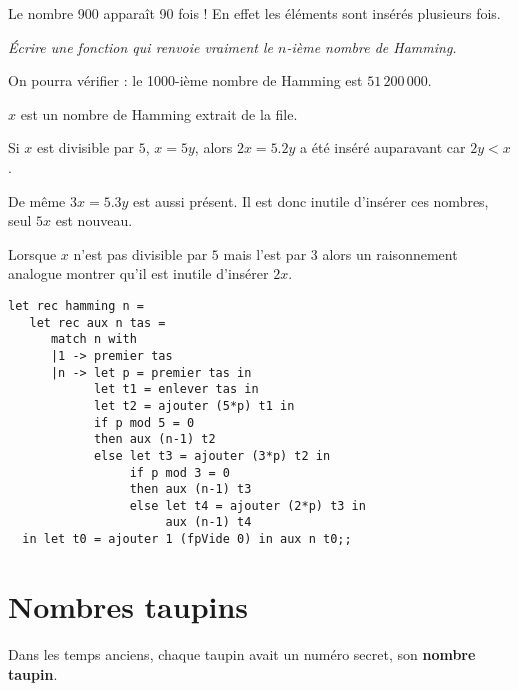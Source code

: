 Le nombre 900 apparaît 90 fois ! En effet les éléments sont insérés plusieurs fois.
\begin{Exercise}[title = Correction]\it 
Écrire une fonction qui renvoie vraiment le $n$-ième nombre de Hamming.

On pourra vérifier : le 1000-ième nombre de Hamming est $51\,200\,000$.
\end{Exercise}
\begin{Answer}$x$ est un nombre de {\sc Hamming} extrait de la file.

Si $x$ est divisible par $5$, $x=5y$, alors $2x = 5.2y$ a été inséré auparavant car $2y < x$.

De même $3x = 5.3y$ est aussi présent. Il est donc inutile d'insérer ces nombres, seul $5x$ est nouveau. 

Lorsque $x$ n'est pas divisible par $5$ mais l'est par $3$ alors un raisonnement analogue montrer qu'il est inutile d'insérer $2x$.

\begin{lstlisting}
let rec hamming n =
   let rec aux n tas =
      match n with
      |1 -> premier tas
      |n -> let p = premier tas in
            let t1 = enlever tas in
            let t2 = ajouter (5*p) t1 in
            if p mod 5 = 0
            then aux (n-1) t2
            else let t3 = ajouter (3*p) t2 in
                 if p mod 3 = 0
                 then aux (n-1) t3
                 else let t4 = ajouter (2*p) t3 in
                      aux (n-1) t4
  in let t0 = ajouter 1 (fpVide 0) in aux n t0;;
\end{lstlisting}
\end{Answer}
\section{Nombres taupins} 
Dans les temps anciens, chaque taupin avait un numéro secret, son {\bf nombre taupin}.

